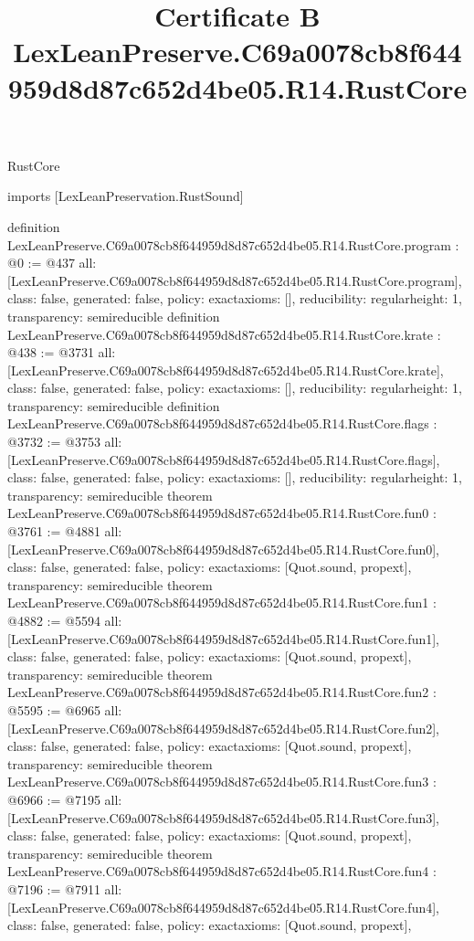 \begin{lexlean}{RustCore}
\title{Certificate B LexLeanPreserve.C69a0078cb8f644959d8d87c652d4be05.R14.RustCore}
\begin{coremodule}
imports [LexLeanPreservation.RustSound]

definition LexLeanPreserve.C69a0078cb8f644959d8d87c652d4be05.R14.RustCore.program : @0 := @437 {
  all: [LexLeanPreserve.C69a0078cb8f644959d8d87c652d4be05.R14.RustCore.program],
  class: false,
  generated: false,
  policy: exact{axioms: []},
  reducibility: regular{height: 1},
  transparency: semireducible
}
definition LexLeanPreserve.C69a0078cb8f644959d8d87c652d4be05.R14.RustCore.krate : @438 := @3731 {
  all: [LexLeanPreserve.C69a0078cb8f644959d8d87c652d4be05.R14.RustCore.krate],
  class: false,
  generated: false,
  policy: exact{axioms: []},
  reducibility: regular{height: 1},
  transparency: semireducible
}
definition LexLeanPreserve.C69a0078cb8f644959d8d87c652d4be05.R14.RustCore.flags : @3732 := @3753 {
  all: [LexLeanPreserve.C69a0078cb8f644959d8d87c652d4be05.R14.RustCore.flags],
  class: false,
  generated: false,
  policy: exact{axioms: []},
  reducibility: regular{height: 1},
  transparency: semireducible
}
theorem LexLeanPreserve.C69a0078cb8f644959d8d87c652d4be05.R14.RustCore.fun0 : @3761 := @4881 {
  all: [LexLeanPreserve.C69a0078cb8f644959d8d87c652d4be05.R14.RustCore.fun0],
  class: false,
  generated: false,
  policy: exact{axioms: [Quot.sound, propext]},
  transparency: semireducible
}
theorem LexLeanPreserve.C69a0078cb8f644959d8d87c652d4be05.R14.RustCore.fun1 : @4882 := @5594 {
  all: [LexLeanPreserve.C69a0078cb8f644959d8d87c652d4be05.R14.RustCore.fun1],
  class: false,
  generated: false,
  policy: exact{axioms: [Quot.sound, propext]},
  transparency: semireducible
}
theorem LexLeanPreserve.C69a0078cb8f644959d8d87c652d4be05.R14.RustCore.fun2 : @5595 := @6965 {
  all: [LexLeanPreserve.C69a0078cb8f644959d8d87c652d4be05.R14.RustCore.fun2],
  class: false,
  generated: false,
  policy: exact{axioms: [Quot.sound, propext]},
  transparency: semireducible
}
theorem LexLeanPreserve.C69a0078cb8f644959d8d87c652d4be05.R14.RustCore.fun3 : @6966 := @7195 {
  all: [LexLeanPreserve.C69a0078cb8f644959d8d87c652d4be05.R14.RustCore.fun3],
  class: false,
  generated: false,
  policy: exact{axioms: [Quot.sound, propext]},
  transparency: semireducible
}
theorem LexLeanPreserve.C69a0078cb8f644959d8d87c652d4be05.R14.RustCore.fun4 : @7196 := @7911 {
  all: [LexLeanPreserve.C69a0078cb8f644959d8d87c652d4be05.R14.RustCore.fun4],
  class: false,
  generated: false,
  policy: exact{axioms: [Quot.sound, propext]},
}
\end{coremodule}
\end{lexlean}
